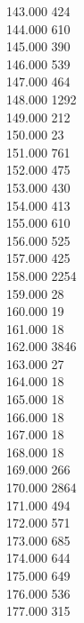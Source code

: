 { 143.000	424 \\
 144.000	610 \\
 145.000	390 \\
 146.000	539 \\
 147.000	464 \\
 148.000	1292 \\
 149.000	212 \\
 150.000	23 \\
 151.000	761 \\
 152.000	475 \\
 153.000	430 \\
 154.000	413 \\
 155.000	610 \\
 156.000	525 \\
 157.000	425 \\
 158.000	2254 \\
 159.000	28 \\
 160.000	19 \\
 161.000	18 \\
 162.000	3846 \\
 163.000	27 \\
 164.000	18 \\
 165.000	18 \\
 166.000	18 \\
 167.000	18 \\
 168.000	18 \\
 169.000	266 \\
 170.000	2864 \\
 171.000	494 \\
 172.000	571 \\
 173.000	685 \\
 174.000	644 \\
 175.000	649 \\
 176.000	536 \\
 177.000	315 \\
}
